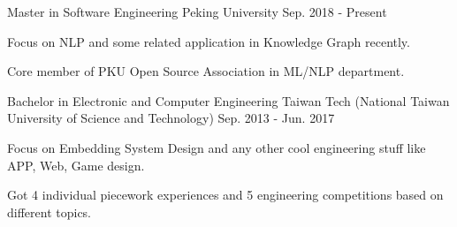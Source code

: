 

\begin{cventries}

  \cventry
    {Master in Software Engineering} %
    {Peking University} %
    {} %
    {Sep. 2018 - Present} %
    {
      \begin{cvitems} %
        \item {Focus on NLP and some related application in Knowledge Graph recently.}
        \item {Core member of PKU Open Source Association in ML/NLP department.}
      \end{cvitems}
    }

  \cventry
    {Bachelor in Electronic and Computer Engineering} %
    {Taiwan Tech (National Taiwan University of Science and Technology)} %
    {} %
    {Sep. 2013 - Jun. 2017} %
    {
      \begin{cvitems} %
        \item {Focus on Embedding System Design and any other cool engineering stuff like APP, Web, Game design.}
        \item {Got 4 individual piecework experiences and 5 engineering competitions based on different topics.}
      \end{cvitems}
    }

\end{cventries}
